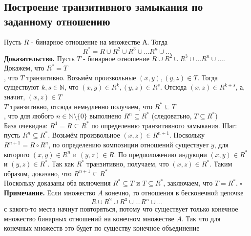 \documentclass[a4paper]{article}
\newcommand{\qed}{\hfill$\square$}
\begin{document}
\subsection{Построение транзитивного замыкания по заданному отношению}
Пусть $R$ - бинарное отношение на множестве А. Тогда
$$
R^{*}=R \cup R^{2} \cup R^{3} \cup \ldots R^{n} \cup \ldots
$$
\indent\textbf{Доказательство.} Пусть $T$ - бинарное отношение $R \cup R^{2} \cup R^{3} \cup \ldots R^{n} \cup \ldots$. Докажем, что $R^{*}=T$\\[2mm]
, что $T$ транзитивно. Возьмём произвольные $(x, y),(y, z) \in T$. Тогда существуют $k, s \in \mathbb{N}$, что $(x, y) \in R^{k},(y, z) \in R^{s}$. Отсюда $(x, z) \in R^{k+s}$, а, значит, $(x, z) \in T$\\[2mm]
 $T$ транзитивно, отсюда немедленно получаем, что $R^{*} \subseteq T$\\[2mm]
, что для любого $n \in \mathbb{N} \setminus\{0\}$ выполнено $R^{n} \subseteq R^{*}$ (следоватьно, $T \subseteq R^{*}$)\\
База очевидна: $R^{1}=R \subseteq R^{*}$ по определению транзитивного замыкания. Шаг: пусть $R^{n} \subseteq R^{*}$. Возьмём произвольное $(x, z) \in R^{n+1}$. Поскольку $R^{n+1}=R \circ R^{n}$, по определению композиции отношений существует $y$, для которого $(x, y) \in R^{n}$ и $(y, z) \in R$. По предположению индукции $(x, y) \in R^{*}$ и $(y, z) \in R^{*}$. Так как $R^{*}$ транзитивно, получаем, что $(x, z) \in R^{*}$. Таким образом, доказано, что $R^{n+1} \subseteq R^{*}$\\[2mm]
\indent Поскольку доказаны оба включения $R^{*} \subseteq T$ и $T \subseteq R^{*}$, заключаем, что $T=R^{*}$. \qed\\[2mm]
\textbf{Примечание.} Если множество $A$ конечно, то отношения в бесконечной цепочке $$R \cup R^{2} \cup R^{3} \cup \ldots R^{n} \cup \ldots$$ с какого-то места начнут повторяться, потому что существует только конечное множество бинарных отношений на конечном множестве $A$. Так что для конечных множеств это будет по существу конечное объединение
\end{document}
